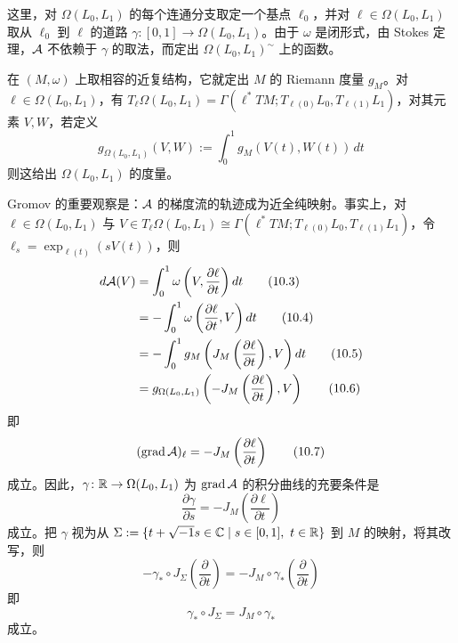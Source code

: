 
这里，对 $\Omega(L_0,L_1)$ 的每个连通分支取定一个基点 $\ell_0$，并对 $\ell\in\Omega(L_0,L_1)$ 取从 $\ell_0$ 到 $\ell$ 的道路 $\gamma\colon[0,1]\to\Omega(L_0,L_1)$。由于 $\omega$ 是闭形式，由 Stokes 定理，$\mathcal{A}$ 不依赖于 $\gamma$ 的取法，而定出 $\Omega(L_0,L_1)^{\sim}$ 上的函数。

在 $(M,\omega)$ 上取相容的近复结构，它就定出 $M$ 的 Riemann 度量 $g_M$。对 $\ell\in\Omega(L_0,L_1)$，有 $T_\ell\Omega(L_0,L_1)=\Gamma(\ell^*TM;T_{\ell(0)}L_0,T_{\ell(1)}L_1)$，对其元素 $V,W$，若定义
\begin{equation}
    g_{\Omega(L_0,L_1)}(V,W):=\int_0^1 g_M(V(t),W(t))\,dt \tag{10.2}
\end{equation}
则这给出 $\Omega(L_0,L_1)$ 的度量。

Gromov 的重要观察是：$\mathcal{A}$ 的梯度流的轨迹成为近全纯映射。事实上，对 $\ell\in\Omega(L_0,L_1)$ 与 $V\in T_\ell\Omega(L_0,L_1)\cong\Gamma(\ell^*TM;T_{\ell(0)}L_0,T_{\ell(1)}L_1)$，令 $\ell_s=\exp_{\ell(t)}(sV(t))$，则
\begin{align}
    d\mathcal{A}(V) &= \int_0^1 \omega\left(V,\frac{\partial\ell}{\partial t}\right)dt \tag{10.3}\\
    &= -\int_0^1 \omega\left(\frac{\partial\ell}{\partial t},V\right)dt \tag{10.4}\\
    &= -\int_0^1 g_M\left(J_M\left(\frac{\partial\ell}{\partial t}\right),V\right)dt \tag{10.5}\\
    &= g_{\Omega(L_0,L_1)}\left(-J_M\left(\frac{\partial\ell}{\partial t}\right),V\right) \tag{10.6}
\end{align}
即
\begin{equation}
    (\operatorname{grad}\mathcal{A})_\ell=-J_M\left(\frac{\partial\ell}{\partial t}\right) \tag{10.7}
\end{equation}
成立。因此，$\gamma\colon\mathbb{R}\to\Omega(L_0,L_1)$ 为 $\operatorname{grad}\mathcal{A}$ 的积分曲线的充要条件是
\begin{equation}
    \frac{\partial\gamma}{\partial s}=-J_M\left(\frac{\partial\ell}{\partial t}\right) \tag{10.8}
\end{equation}
成立。把 $\gamma$ 视为从 $\Sigma:=\{t+\sqrt{-1}s\in\mathbb{C}\mid s\in[0,1],\ t\in\mathbb{R}\}$ 到 $M$ 的映射，将其改写，则
\begin{equation}
    -\gamma_*\circ J_\Sigma\left(\frac{\partial}{\partial t}\right)=-J_M\circ\gamma_*\left(\frac{\partial}{\partial t}\right) \tag{10.9}
\end{equation}
即
\begin{equation}
    \gamma_*\circ J_\Sigma=J_M\circ\gamma_* \tag{10.10}
\end{equation}
成立。

